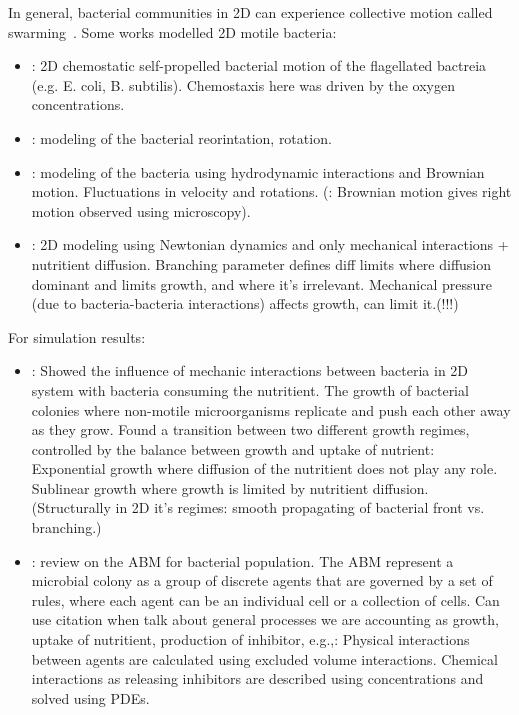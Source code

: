 \documentclass[10pt,A4paper]{article}
\begin{document}
In general, bacterial communities in 2D can experience collective motion called swarming~\cite{wu_collective_2015}.
Some works modelled 2D motile bacteria:
\begin{itemize}
    \item \cite{decoene_microscopic_2011}: 2D chemostatic self-propelled bacterial motion of the flagellated bactreia (e.g. E. coli, B. subtilis).
    Chemostaxis here was driven by the oxygen concentrations.
    \item \cite{rosser_modelling_2014}: modeling of the bacterial reorintation, rotation.
    \item \cite{sokolov_physical_2012, li_amplified_2008}: modeling of the bacteria using hydrodynamic interactions and Brownian motion.
    Fluctuations in velocity and rotations.
    (\cite{li_amplified_2008}: Brownian motion gives right motion observed using microscopy).
    \item \cite{farrell_mechanically_2013}: 2D modeling using Newtonian dynamics and only mechanical interactions + nutritient diffusion.
    Branching parameter defines diff limits where diffusion dominant and limits growth, and where it's irrelevant.
    Mechanical pressure (due to bacteria-bacteria interactions) affects growth, can limit it.(!!!)
\end{itemize}
%
For simulation results:
\begin{itemize}
    \item \cite{farrell_mechanically_2013}: Showed the influence of mechanic interactions between bacteria in 2D system with bacteria consuming the nutritient.
    The growth of bacterial colonies where non-motile microorganisms replicate and push each other away as they grow.
    Found a transition between two different growth regimes, controlled by the balance between growth and uptake of nutrient:\\
    Exponential growth where diffusion of the nutritient does not play any role. Sublinear growth where growth is limited by nutritient diffusion.
    (Structurally in 2D it's regimes: smooth propagating of bacterial front vs. branching.)
    \item \cite{nagarajan_agent-based_2022-1}: review on the ABM for bacterial population.
    The ABM represent a microbial colony as a group of discrete agents that are governed by a set of rules, where each agent can be an individual cell or a collection of cells.
    Can use citation when talk about general processes we are accounting as growth, uptake of nutritient, production of inhibitor, e.g.,:
    Physical interactions between agents are calculated using excluded volume interactions.
    Chemical interactions as releasing inhibitors are described using concentrations and solved using PDEs.
\end{itemize}
\end{document}
